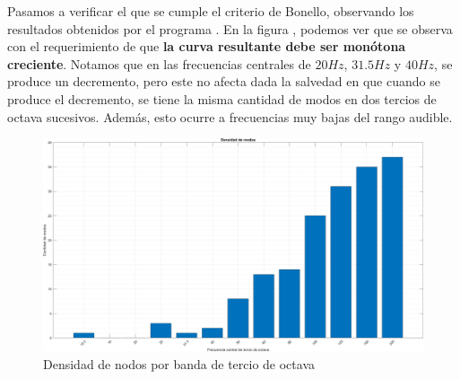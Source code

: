 \par Pasamos a verificar el que se cumple el criterio de Bonello, observando los resultados obtenidos por el programa . En la figura , podemos ver que se observa con el requerimiento de que \textbf{la curva resultante debe ser monótona creciente}. Notamos que en las frecuencias centrales de $20Hz$, $31.5Hz$ y $40Hz$, se produce un decremento, pero este no afecta dada la salvedad en que cuando se produce el decremento, se tiene la misma cantidad de modos en dos tercios de octava sucesivos. Además, esto ocurre a frecuencias muy bajas del rango audible.


\begin{figure}[H]
	\centering
	\includegraphics[width=1\textwidth]{./img/modos_resonancia.png}
	\caption{Densidad de nodos por banda de tercio de octava}
	\label{fig:modos_resonancia}
\end{figure}

\newpage

